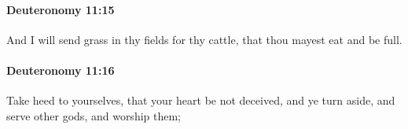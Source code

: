 		\paragraph{Deuteronomy 11:15} %
			\label{DEUTERONOMY-11-15}

			And I will send grass in thy fields for thy cattle, that thou mayest eat and be full.


		\paragraph{Deuteronomy 11:16} %
			\label{DEUTERONOMY-11-16}

			Take heed to yourselves, that your heart be not deceived, and ye turn aside, and serve other gods, and worship them;


